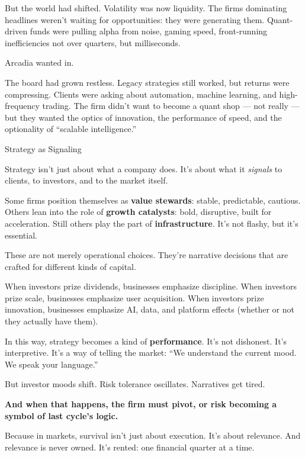 But the world had shifted. Volatility was now liquidity.
The firms dominating headlines weren’t waiting for opportunities: they were generating them.
Quant-driven funds were pulling alpha from noise, gaming speed, front-running inefficiencies not over quarters, but milliseconds.

Arcadia wanted in.

The board had grown restless.
Legacy strategies still worked, but returns were compressing. Clients were asking about automation, machine learning, 
and high-frequency trading.
The firm didn’t want to become a quant shop — not really — but they wanted the optics of innovation, the performance of speed, 
and the optionality of “scalable intelligence.”

\medskip

\begin{PhilosophicalSidebar}{Strategy as Signaling}

  Strategy isn’t just about what a company does.  
  It’s about what it \textit{signals} to clients, to investors, and to the market itself.
  
  \medskip
  
  Some firms position themselves as \textbf{value stewards}: stable, predictable, cautious.  
  Others lean into the role of \textbf{growth catalysts}: bold, disruptive, built for acceleration.  
  Still others play the part of \textbf{infrastructure}. It's not flashy, but it's essential.
  
  \medskip
  
  These are not merely operational choices.  
  They’re narrative decisions that are crafted for different kinds of capital.
  
  \medskip
  
  When investors prize dividends, businesses emphasize discipline.  
  When investors prize scale, businesses emphasize user acquisition.  
  When investors prize innovation, businesses emphasize AI, data, and platform effects
  (whether or not they actually have them).
  
  \medskip
  
  In this way, strategy becomes a kind of \textbf{performance}.  
  It's not dishonest. It's interpretive.  
  It's a way of telling the market: ``We understand the current mood. We speak your language.''
  
  \medskip
  
  But investor moods shift.  
  Risk tolerance oscillates.  
  Narratives get tired.

  \medskip
  
  \textbf{And when that happens, the firm must pivot, or risk becoming a symbol of last cycle’s logic.}
  
  \medskip
  
  Because in markets, survival isn’t just about execution.  
  It’s about relevance.  
  And relevance is never owned.  
  It’s rented: one financial quarter at a time.
  
\end{PhilosophicalSidebar}

